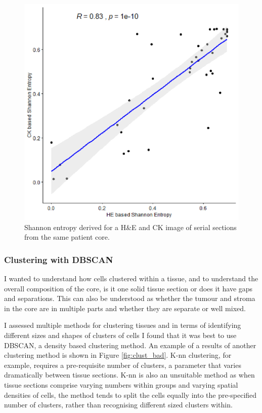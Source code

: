 \begin{figure}
    \centering
    \includegraphics{Chapter3/Figs/Thesis-06.png}
    \caption{Shannon entropy derived for a H\&E and CK image of serial sections from the same patient core.}
    \label{fig:entropy}
\end{figure}

\subsubsection*{Clustering with DBSCAN}
I wanted to understand how cells clustered within a tissue, and to understand the overall composition of the core, is it one solid tissue section or does it have gaps and separations. This can also be understood as whether the tumour and stroma in the core are in multiple parts and whether they are separate or well mixed.

I assessed multiple methods for clustering tissues and in terms of identifying different sizes and shapes of clusters of cells I found that it was best to use DBSCAN, a density based clustering method. An example of a results of another clustering method is shown in Figure \ref{fig:clust_bad}. K-nn clustering, for example, requires a pre-requisite number of clusters, a parameter that varies dramatically between tissue sections. K-nn is also an unsuitable method as when tissue sections comprise varying numbers within groups and varying spatial densities of cells, the method tends to split the cells equally into the pre-specified number of clusters, rather than recognising different sized clusters within.

